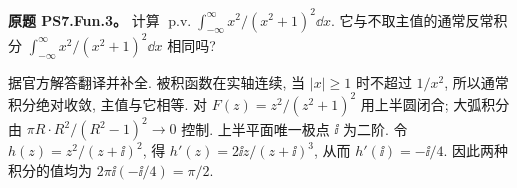 \begin{exercise}
\textbf{原题 PS7.Fun.3。}\label{ass:ps7-fun3}
计算 $\operatorname{p.v.}\int_{-\infty}^{\infty}x^2/(x^2+1)^2\dd x$. 它与不取主值的通常反常积分 $\int_{-\infty}^{\infty}x^2/(x^2+1)^2\dd x$ 相同吗?
\end{exercise}
\begin{solution}
据官方解答翻译并补全. 被积函数在实轴连续, 当 $|x|\ge1$ 时不超过 $1/x^2$, 所以通常积分绝对收敛, 主值与它相等.
对 $F(z)=z^2/(z^2+1)^2$ 用上半圆闭合; 大弧积分由 $\pi R\cdot R^2/(R^2-1)^2\to0$ 控制. 上半平面唯一极点 $\ii$ 为二阶. 令 $h(z)=z^2/(z+\ii)^2$, 得
$h'(z)=2\ii z/(z+\ii)^3$, 从而 $h'(\ii)=-\ii/4$. 因此两种积分的值均为 $2\pi\ii(-\ii/4)=\pi/2$.
\end{solution}
